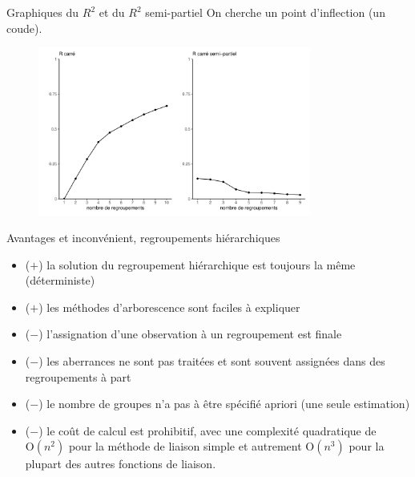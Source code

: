 \documentclass[
  ignorenonframetext,
]{beamer}
\providecommand{\tightlist}{%
  \setlength{\itemsep}{0pt}\setlength{\parskip}{0pt}}\usepackage{longtable,booktabs,array}
\begin{document}
\begin{frame}{Graphiques du \(R^2\) et du \(R^2\) semi-partiel}
\protect\hypertarget{graphiques-du-r2-et-du-r2-semi-partiel}{}
On cherche un point d'inflection (un coude).

\begin{figure}

{\centering \includegraphics[width=0.8\textwidth,height=\textheight]{MATH60602-diapos12_files/figure-beamer/unnamed-chunk-15-1.pdf}

}

\end{figure}
\end{frame}

\begin{frame}{Avantages et inconvénient, regroupements hiérarchiques}
\protect\hypertarget{avantages-et-inconvuxe9nient-regroupements-hiuxe9rarchiques}{}
\begin{itemize}
\tightlist
\item
  (\(+\)) la solution du regroupement hiérarchique est toujours la même
  (déterministe)
\item
  (\(+\)) les méthodes d'arborescence sont faciles à expliquer
\item
  (\(-\)) l'assignation d'une observation à un regroupement est finale
\item
  (\(-\)) les aberrances ne sont pas traitées et sont souvent assignées
  dans des regroupements à part
\item
  (\(-\)) le nombre de groupes n'a pas à être spécifié apriori (une
  seule estimation)
\item
  (\(-\)) le coût de calcul est prohibitif, avec une complexité
  quadratique de \(\mathrm{O}(n^2)\) pour la méthode de liaison simple
  et autrement \(\mathrm{O}(n^3)\) pour la plupart des autres fonctions
  de liaison.
\end{itemize}
\end{frame}
\end{document}
